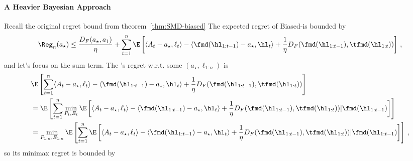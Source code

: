 \paragraph{A Heavier Bayesian Approach}
Recall the original regret bound from theorem~\ref{thm:SMD-biased}
The expected regret of Biased-\smdalg is bounded by
\begin{align*}
    \Reg_n(a_\star) \leq
    \frac{D_F(a_\star, a_1)}{\eta} +
    \sum_{t=1}^{n}
    \E\left[
        \langle A_t - a_\star, \ell_t\rangle
        - \langle \fmd(\hl_{1:t-1}) - a_\star, \hl_t\rangle
        + \frac{1}{\eta} D_F(\fmd(\hl_{1:t-1}), \tfmd(\hl_{1:t}))
        \right]\,,
\end{align*}
and let's focus on the sum term.
The {\expbyopt}'s regret w.r.t. some $(a_\star, \ell_{1:n})$ is
\begin{align*}
     & \E\left[
        \sum_{t=1}^{n}
        \langle A_t - a_\star, \ell_t\rangle
        - \langle \fmd(\hl_{1:t-1}) - a_\star, \hl_t\rangle
        + \frac{1}{\eta} D_F(\fmd(\hl_{1:t-1}), \tfmd(\hl_{1:t}))
        \right]
    \\
     & =
    \E\left[
        \sum_{t=1}^{n}
        \min_{P_t, E_t}
        \E\left[
            \langle A_t - a_\star, \ell_t\rangle
            - \langle \fmd(\hl_{1:t-1}) - a_\star, \hl_t\rangle
            + \frac{1}{\eta} D_F(\fmd(\hl_{1:t-1}), \tfmd(\hl_{1:t}))
            | \fmd(\hl_{1:t-1})
            \right]
        \right]
    \\
     & =
    \min_{P_{1:n}, E_{1:n}}
    \E\left[
        \sum_{t=1}^{n}
        \E\left[
            \langle A_t - a_\star, \ell_t\rangle
            - \langle \fmd(\hl_{1:t-1}) - a_\star, \hl_t\rangle
            + \frac{1}{\eta} D_F(\fmd(\hl_{1:t-1}), \tfmd(\hl_{1:t}))
            | \fmd(\hl_{1:t-1})
            \right]
        \right]\,,
\end{align*}
so its minimax regret is bounded by
